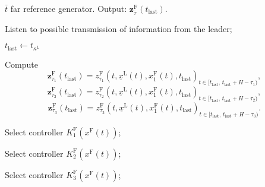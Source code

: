 \documentclass[letterpaper, 10 pt, conference]{ieeeconf}
\theoremstyle{definition}
\theoremstyle{nopoint}
\begin{document}
\begin{algorithm}
\caption{$\bar{t}$ far reference generator. Output: $\mathbf{z}_{\bar{\tau}}^\mathrm{F}(t_{\mathrm{last}})$. }\label{alg:switched_controller}
\begin{algorithmic}[1]
\Loop

\State Listen to possible transmission of information from the leader;

 
\State $t_{\mathrm{last}} \leftarrow t_{\kappa^\mathrm{L}}$

\State Compute
\begin{equation}\label{eq:reference_z_F_tau_1}
 \mathbf{z}_{\tau_1}^\mathrm{F}(t_{\mathrm{last}})={z_{\tau_1}^\mathrm{F}(t,\underline{x}^\mathrm{L}(t),x_1^\mathrm{F}(t),t_{\mathrm{last}})}_{t\in [t_{\mathrm{last}}, \, t_{\mathrm{last}}+H-\tau_1 )},
\end{equation}
\begin{equation}\label{eq:reference_z_F_tau_2}
 \mathbf{z}_{\tau_2}^\mathrm{F}(t_{\mathrm{last}})={z_{\tau_2}^\mathrm{F}(t,\underline{x}^\mathrm{L}(t),x_1^\mathrm{F}(t),t_{\mathrm{last}})}_{t\in [t_{\mathrm{last}}, \, t_{\mathrm{last}}+H-\tau_2 )},
\end{equation}
\begin{equation}\label{eq:reference_z_F_tau_3}
 \mathbf{z}_{\tau_3}^\mathrm{F}(t_{\mathrm{last}})={z_{\tau_3}^\mathrm{F}(t,\underline{x}^\mathrm{L}(t),x_1^\mathrm{F}(t),t_{\mathrm{last}})}_{t\in [t_{\mathrm{last}}, \, t_{\mathrm{last}}+H-\tau_3 )}.
\end{equation}



\State Select controller $K^{\mathrm{F}}_1(x^{\mathrm{F}}(t))$;






\State Select controller $K^{\mathrm{F}}_2(x^{\mathrm{F}}(t))$;

\Else

\State Select controller $K^{\mathrm{F}}_3(x^{\mathrm{F}}(t))$;

\EndIf

\EndIf





\EndLoop

\end{algorithmic}
\end{algorithm}
\end{document}
